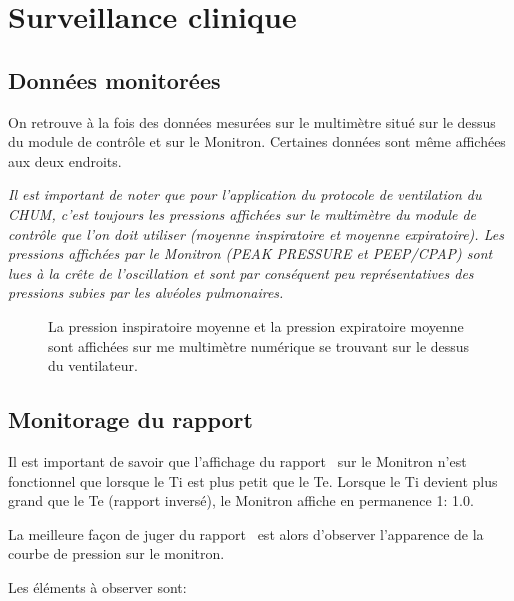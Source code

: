 \chapter{Surveillance clinique}

\section{Données monitorées}

On retrouve à la fois des données mesurées sur le multimètre situé sur
le dessus du module de contrôle et sur le Monitron. Certaines données
sont même affichées aux deux endroits.

\begin{auchum}
\emph{Il est important de noter que pour l'application du protocole de
ventilation du CHUM, c'est toujours les pressions affichées sur le
multimètre du module de contrôle que l'on doit utiliser (moyenne
inspiratoire et moyenne expiratoire).  Les pressions affichées par le Monitron (PEAK PRESSURE et PEEP/CPAP)
sont lues à la crête de l'oscillation et sont par conséquent peu
représentatives des pressions subies par les alvéoles pulmonaires.
}
\end{auchum}

\begin{figure}
	\begin{wide}
	
	\caption[Pressions affichées sur le multimètre numérique]{La pression inspiratoire moyenne et la pression expiratoire moyenne sont affichées sur me multimètre numérique se trouvant sur le dessus du ventilateur.}
	\end{wide}
\end{figure}


\section{Monitorage du rapport \ie}

Il est important de savoir que l'affichage du rapport \ie\ sur le
Monitron n'est fonctionnel que lorsque le Ti est plus petit que le Te.
Lorsque le Ti devient plus grand que le Te (rapport inversé), le
Monitron affiche en permanence 1\string: 1.0.

La meilleure façon de juger du rapport \ie\ est alors d'observer
l'apparence de la courbe de pression sur le monitron.

Les éléments à observer sont:

